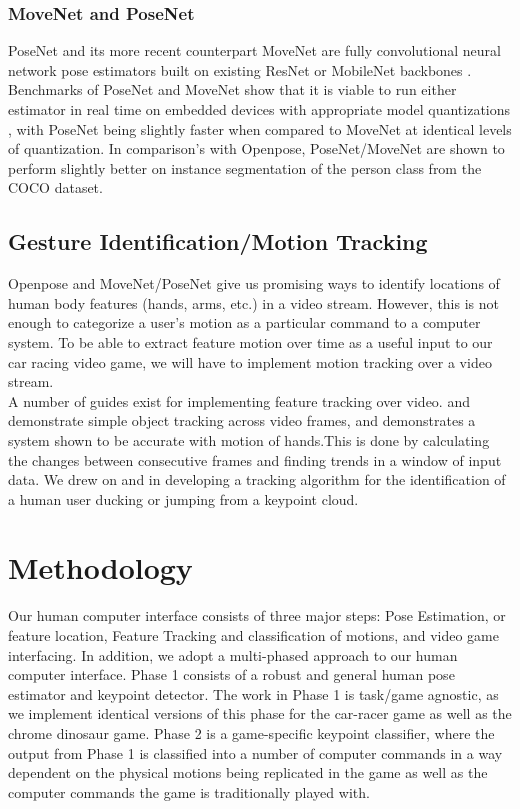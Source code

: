 \documentclass[10pt,twocolumn,letterpaper]{article}
\begin{document}
\subsubsection{MoveNet and PoseNet}

PoseNet and its more recent counterpart MoveNet are fully convolutional neural network pose 
estimators built on existing ResNet or MobileNet backbones \cite{PoseNet}. Benchmarks of PoseNet and MoveNet show that it is 
viable to run either estimator in real time on embedded devices with appropriate 
model quantizations \cite{tensorflowPoseNet}, with PoseNet being slightly faster when compared to MoveNet at identical 
levels of quantization. In comparison's with Openpose, PoseNet/MoveNet are shown to perform 
slightly better on instance segmentation of the person class from the COCO dataset.

\subsection{Gesture Identification/Motion Tracking}
Openpose and MoveNet/PoseNet give us promising ways to identify locations of human body features 
(hands, arms, etc.) in a video stream. However, this is not enough to categorize a user's motion 
as a particular command to a computer system. To be able to extract feature motion over time 
as a useful input to our car racing video game, we will have to implement motion tracking 
over a video stream.\\ 

A number of guides exist for implementing feature tracking over video. \cite{tracking_1} 
and \cite{tracking_2} demonstrate simple object tracking across video frames, and \cite{tracking_2} 
demonstrates a system shown to be accurate with motion of hands.This is done by calculating the changes between consecutive frames and finding trends in a window of input data. We drew on \cite{tracking_1} and 
\cite{tracking_2} in developing a tracking algorithm for the identification of a human user ducking 
or jumping from a keypoint cloud.

\section{Methodology}
Our human computer interface consists of three major steps: Pose Estimation, or feature 
location, Feature Tracking and classification of motions, and video game interfacing. In addition, 
we adopt a multi-phased approach to our human computer interface. Phase 1 consists of a robust and 
general human pose estimator and keypoint detector. The work in Phase 1 is task/game agnostic, as 
we implement identical versions of this phase for the car-racer game as well as the chrome 
dinosaur game. Phase 2 is a game-specific keypoint classifier, where the output from Phase 1 is 
classified into a number of computer commands in a way dependent on the physical motions being 
replicated in the game as well as the computer commands the game is traditionally played with.\\
\end{document}
